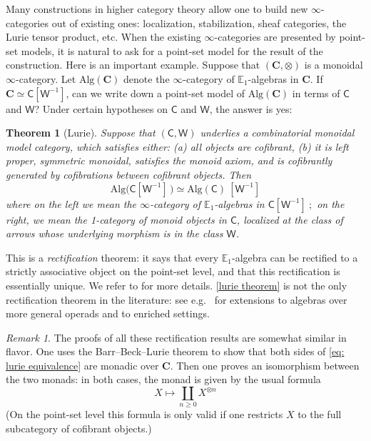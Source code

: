 \documentclass{proc-l}
\theoremstyle{plain}
\newtheorem{theorem}{Theorem}[section]
\theoremstyle{definition}
\theoremstyle{remark}
\newtheorem{remark}[{theorem}]{Remark}
\begin{document}
Many constructions in higher category theory allow one to build new $\infty$-categories out of existing ones: localization, stabilization, sheaf categories, the Lurie tensor product, etc. When the existing $\infty$-categories are presented by point-set models, it is natural to ask for a point-set model for the result of the construction. Here is an important example. Suppose that $(\mathbf C, \otimes)$ is a {monoidal} $\infty$-category. Let $\mathrm{Alg}(\mathbf C)$ denote the $\infty$-category of $\mathbb E_1$-algebras in $\mathbf C$. If $\mathbf C \simeq \mathsf C[\mathsf W^{-1}]$, can we write down a point-set model of $\mathrm{Alg}(\mathbf C)$ in terms of $\mathsf C$ and $\mathsf W$? Under certain hypotheses on $\mathsf C$ and $\mathsf W$, the answer is yes:

\begin{theorem}[{Lurie}]%
\label{Theorem:1.1} \label{lurie theorem} Suppose that $(\mathsf C,\mathsf W)$ underlies a combinatorial monoidal model category, which satisfies either: (a) all objects are cofibrant, (b) it is left proper, symmetric monoidal, satisfies the monoid axiom, and is cofibrantly generated by cofibrations between cofibrant objects. Then
\begin{equation}
\label{eq: lurie equivalence}\mathrm{Alg}\big(\mathsf C[\mathsf W^{-1}]\, \big) \simeq \mathrm{Alg}(\mathsf C)~[\mathsf W^{-1}]
\end{equation}%
where on the left we mean the $\infty$-category of $\mathbb E_1$-algebras in $\mathsf C[\mathsf W^{-1}]~;$ on the right, we mean the 1-category of monoid objects in $\mathsf C$, localized at the class of arrows whose underlying morphism is in the class $\mathsf W$.
\end{theorem}

This is a \emph{rectification} theorem: it says that every $\mathbb E_1$-algebra can be rectified to a strictly associative object on the point-set level, and that this rectification is essentially unique. We refer to \cite[Section 4.1.8]{HigherAlgebra} for more details. \cref{lurie theorem} is not the only rectification theorem in the literature: see e.g.\ \cite{haugseng-rectification,HinichRectification,PavlovScholbach18} for extensions to algebras over more general operads and to enriched settings.

\begin{remark}%
\label{Remark:1.2}\label{strategy remark}
The proofs of all these rectification results are somewhat similar in flavor. One uses the Barr--Beck--Lurie theorem to show that both sides of \eqref{eq: lurie equivalence} are monadic over $\mathbf C$. Then one proves an isomorphism between the two monads: in both cases, the monad is given by the usual formula
\begin{equation}
\label{classical free algebra} X \mapsto \coprod_{n \geq 0} X^{\otimes n}
\end{equation}%
(On the point-set level this formula is only valid if one restricts $X$ to the full subcategory of cofibrant objects.)
\end{remark}
\end{document}
